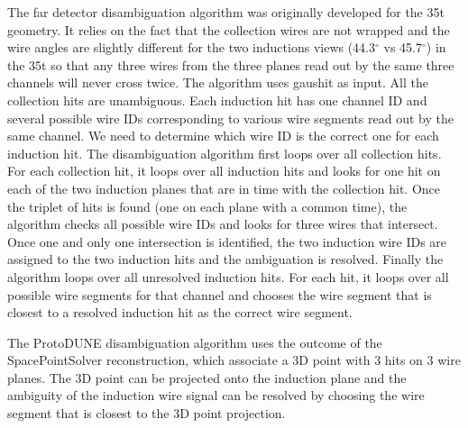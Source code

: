 The far detector disambiguation algorithm was originally developed for the 35t geometry. It relies on the fact that the collection wires are not wrapped and the wire angles are slightly different for the two inductions views (44.3$^{\circ}$ vs 45.7$^{\circ}$) in the 35t so that any three wires from the three planes read out by the same three channels will never cross twice. The algorithm uses gaushit as input. All the collection hits are unambiguous. Each induction hit has one channel ID and several possible wire IDs corresponding to various wire segments read out by the same channel. We need to determine which wire ID is the correct one for each induction hit. The disambiguation algorithm first loops over all collection hits. For each collection hit, it loops over all induction hits and looks for one hit on each of the two induction planes that are in time with the collection hit. Once the triplet of hits is found (one on each plane with a common time), the algorithm checks all possible wire IDs and looks for three wires that intersect. Once one and only one intersection is identified, the two induction wire IDs are assigned to the two induction hits and the ambiguation is resolved. Finally the algorithm loops over all unresolved induction hits. For each hit, it loops over all possible wire segments for that channel and chooses the wire segment that is closest to a resolved induction hit as the correct wire segment. 

The ProtoDUNE disambiguation algorithm uses the outcome of the SpacePointSolver reconstruction, which associate a 3D point with 3 hits on 3 wire planes. The 3D point can be projected onto the induction plane and the ambiguity of the induction wire signal can be resolved by choosing the wire segment that is closest to the 3D point projection. 


